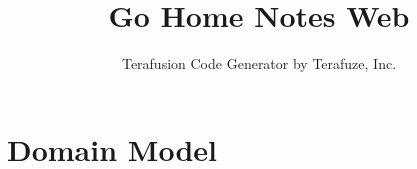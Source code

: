 \documentclass[10pt]{report}
\title{ Go Home Notes Web }
\author{Terafusion Code Generator by Terafuze, Inc.}
\begin{document}
\maketitle
\tableofcontents

\chapter{Domain Model}


\end{document}
